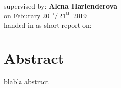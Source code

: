 \begin{center}
	\makeatletter
	\thispagestyle{empty}
	\null\vspace{15mm}
	\Huge\textbf{\@title} \\
	\vspace{14mm}
	\Large  \textbf{\@author} \\
	\large supervised by: \textbf{Alena Harlenderova} \\
	\vspace{4mm}
	\large on Feburary $20^{\text{th}} / \ 21^{\text{th}}$ 2019 \\
	\vspace{15mm}
	\large handed in as short report on: \  \@date \\ 
	\makeatother
	\vspace{20mm}
	\section*{Abstract}
\end{center}
blabla abstract

